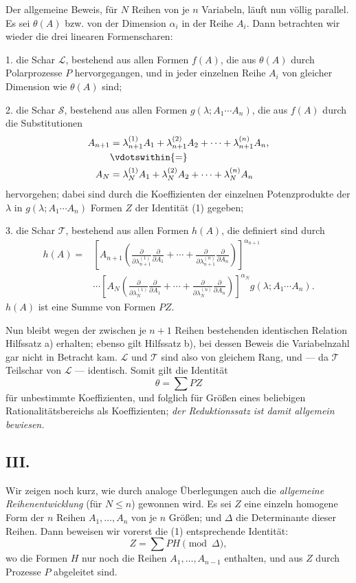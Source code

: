 \documentclass[11pt]{article}
\begin{document}
Der allgemeine Beweis, für $N$ Reihen von je $n$ Variabeln, läuft nun völlig parallel. Es sei $\theta(A)$ bzw. von der Dimension $\alpha_i$ in der Reihe $A_i$. Dann betrachten wir wieder die drei linearen Formenscharen:

1. die Schar $\mathcal L$, bestehend aus allen Formen $f(A)$, die aus $\theta(A)$ durch Polarprozesse $P$ hervorgegangen, und in jeder einzelnen Reihe $A_i$ von gleicher Dimension wie $\theta(A)$ sind;

2. die Schar $\mathcal S$, bestehend aus allen Formen $g(\lambda;A_1\cdots A_n)$, die aus $f(A)$ durch die Substitutionen
\[
\begin{aligned}
 A_{n+1}&=\lambda_{n+1}^{(1)}A_1+\lambda_{n+1}^{(2)}A_2+
        \cdots+\lambda_{n+1}^{(n)}A_n,\\
 &\vdotswithin{=}\\
 A_N&=\lambda_N^{(1)}A_1+\lambda_N^{(2)}A_2+
        \cdots+\lambda_N^{(n)}A_n
\end{aligned}
\]
hervorgehen; dabei sind durch die Koeffizienten der einzelnen Potenzprodukte der $\lambda$ in $g(\lambda;A_1\cdots A_n)$ Formen $Z$ der Identität (1) gegeben;

3. die Schar $\mathcal T$, bestehend aus allen Formen $h(A)$, die definiert sind durch
\[
\begin{aligned}
 h(A)=&\left[A_{n+1}\left(
 \frac{\partial}{\partial\lambda_{n+1}^{(1)}}\frac{\partial}{\partial A_1}
 +\cdots+
 \frac{\partial}{\partial\lambda_{n+1}^{(n)}}\frac{\partial}{\partial A_n}\right)\right]^{\alpha_{n+1}} \\
&\cdots
\left[A_N\left(
 \frac{\partial}{\partial\lambda_N^{(1)}}\frac{\partial}{\partial A_1}
 +\cdots+
 \frac{\partial}{\partial\lambda_N^{(n)}}\frac{\partial}{\partial A_n}\right)\right]^{\alpha_N}
 g(\lambda;A_1\cdots A_n).
\end{aligned}
\]
$h(A)$ ist eine Summe von Formen $PZ$.

Nun bleibt wegen der zwischen je $n+1$ Reihen bestehenden identischen Relation Hilfssatz a) erhalten; ebenso gilt Hilfssatz b), bei dessen Beweis die Variabelnzahl gar nicht in Betracht kam. $\mathcal L$ und $\mathcal T$ sind also von gleichem Rang, und --- da $\mathcal T$ Teilschar von $\mathcal L$ --- identisch. Somit gilt die Identität
\[
  \theta=\sum PZ
\]
für unbestimmte Koeffizienten, und folglich für Größen eines beliebigen Rationalitätsbereichs als Koeffizienten; \emph{der Reduktionssatz ist damit allgemein bewiesen.}

\subsection*{III.}
Wir zeigen noch kurz, wie durch analoge Überlegungen auch die \emph{allgemeine Reihenentwicklung} (für $N\le n$) gewonnen wird. Es sei $Z$ eine einzeln homogene Form der $n$ Reihen $A_1,
\ldots,A_n$ von je $n$ Größen; und $\Delta$ die Determinante dieser Reihen. Dann beweisen wir vorerst die (1) entsprechende Identität:
\begin{equation}
  Z=\sum PH \pmod{\Delta},
\tag{2}
\end{equation}
wo die Formen $H$ nur noch die Reihen $A_1,\ldots,A_{n-1}$ enthalten, und aus $Z$ durch Prozesse $P$ abgeleitet sind.
\end{document}
